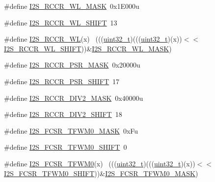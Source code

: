 \begin{DoxyCompactItemize}
\item 
\#define \hyperlink{group___i2_s___register___masks_ga7af986b10e47588d226099813f184f82}{I2\+S\+\_\+\+R\+C\+C\+R\+\_\+\+W\+L\+\_\+\+M\+A\+SK}~0x1\+E000u
\item 
\#define \hyperlink{group___i2_s___register___masks_ga9b1181ebce5a98aad3f11131676eedbc}{I2\+S\+\_\+\+R\+C\+C\+R\+\_\+\+W\+L\+\_\+\+S\+H\+I\+FT}~13
\item 
\#define \hyperlink{group___i2_s___register___masks_ga29ce117a0a1e13114b89141beeee0cc1}{I2\+S\+\_\+\+R\+C\+C\+R\+\_\+\+WL}(x)                                                  ~(((\hyperlink{_p_e___types_8h_a33594304e786b158f3fb30289278f5af}{uint32\+\_\+t})(((\hyperlink{_p_e___types_8h_a33594304e786b158f3fb30289278f5af}{uint32\+\_\+t})(x))$<$$<$\hyperlink{group___i2_s___register___masks_ga9b1181ebce5a98aad3f11131676eedbc}{I2\+S\+\_\+\+R\+C\+C\+R\+\_\+\+W\+L\+\_\+\+S\+H\+I\+FT}))\&\hyperlink{group___i2_s___register___masks_ga7af986b10e47588d226099813f184f82}{I2\+S\+\_\+\+R\+C\+C\+R\+\_\+\+W\+L\+\_\+\+M\+A\+SK})
\item 
\#define \hyperlink{group___i2_s___register___masks_ga38a581e1743cff4f03681b86800bd7c5}{I2\+S\+\_\+\+R\+C\+C\+R\+\_\+\+P\+S\+R\+\_\+\+M\+A\+SK}~0x20000u
\item 
\#define \hyperlink{group___i2_s___register___masks_gacf63e4d10463d91e5e775af3abaf6ddc}{I2\+S\+\_\+\+R\+C\+C\+R\+\_\+\+P\+S\+R\+\_\+\+S\+H\+I\+FT}~17
\item 
\#define \hyperlink{group___i2_s___register___masks_gae5243846c103898144a9af45702c3495}{I2\+S\+\_\+\+R\+C\+C\+R\+\_\+\+D\+I\+V2\+\_\+\+M\+A\+SK}~0x40000u
\item 
\#define \hyperlink{group___i2_s___register___masks_ga6034659ff004a195781001c45ce71836}{I2\+S\+\_\+\+R\+C\+C\+R\+\_\+\+D\+I\+V2\+\_\+\+S\+H\+I\+FT}~18
\item 
\#define \hyperlink{group___i2_s___register___masks_gaedade8038c0e831005bd0313c6c8031c}{I2\+S\+\_\+\+F\+C\+S\+R\+\_\+\+T\+F\+W\+M0\+\_\+\+M\+A\+SK}~0x\+Fu
\item 
\#define \hyperlink{group___i2_s___register___masks_ga8413bb67d10a3236adcc1e822672c8d4}{I2\+S\+\_\+\+F\+C\+S\+R\+\_\+\+T\+F\+W\+M0\+\_\+\+S\+H\+I\+FT}~0
\item 
\#define \hyperlink{group___i2_s___register___masks_ga22418333f4fe6c5b067fbb9f353b61b5}{I2\+S\+\_\+\+F\+C\+S\+R\+\_\+\+T\+F\+W\+M0}(x)                                            ~(((\hyperlink{_p_e___types_8h_a33594304e786b158f3fb30289278f5af}{uint32\+\_\+t})(((\hyperlink{_p_e___types_8h_a33594304e786b158f3fb30289278f5af}{uint32\+\_\+t})(x))$<$$<$\hyperlink{group___i2_s___register___masks_ga8413bb67d10a3236adcc1e822672c8d4}{I2\+S\+\_\+\+F\+C\+S\+R\+\_\+\+T\+F\+W\+M0\+\_\+\+S\+H\+I\+FT}))\&\hyperlink{group___i2_s___register___masks_gaedade8038c0e831005bd0313c6c8031c}{I2\+S\+\_\+\+F\+C\+S\+R\+\_\+\+T\+F\+W\+M0\+\_\+\+M\+A\+SK})

\end{DoxyCompactItemize}
